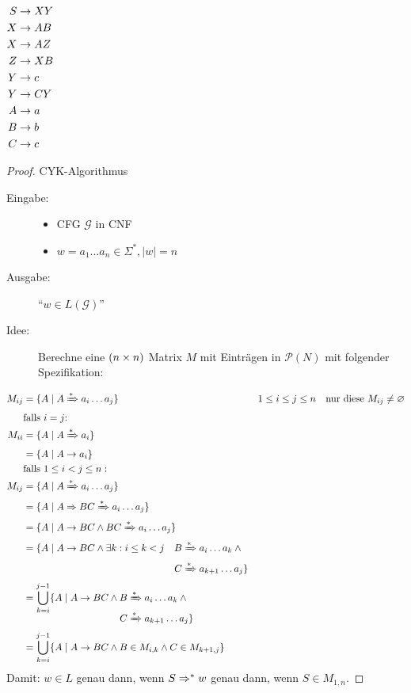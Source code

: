 	$\begin{aligned}[t]
		S &\-> XY\\
		X &\-> AB\\
		X &\-> AZ\\
		Z &\-> XB\\
		Y &\-> c\\
		Y &\-> CY\\
		A &\-> a\\
		B &\-> b\\
		C &\-> c
	\end{aligned}$\quad
\begin{proof}
		\ac{CYK}-Algorithmus
		\begin{description}
	    \item[Eingabe:]
		\begin{itemize}
			\item \ac{CFG} $\mathcal{G}$ in \ac{CNF}
			\item $w = a_1\dots a_n\in\Sigma^*, |w|=n$
		\end{itemize}
		\item[Ausgabe:] "`$w\in L(\mathcal{G})$"'
		\item[Idee:] Berechne eine $(n\times n)$ Matrix $M$ mit Einträgen in $\mathcal{P}(N)$ mit folgender Spezifikation:
		\end{description}
	\begin{align*}
		M_{ij} &= \{ A \mid A\xRightarrow{*} a_i\dots a_j \} && 1\leq i\leq j\leq n \quad\text{nur diese }M_{ij}\neq \varnothing\\
		& \text{falls $i=j$:}\\
		M_{ii} &= \{ A \mid A\xRightarrow{*} a_i\}\\
		&= \{A \mid A\-> a_i \} \\
		&\text{falls }1\leq i<j\leq n:\\
		M_{ij} &= \{ A \mid A\xRightarrow{*} a_i\dots a_j \}\\
		&= \{ A \mid A\=> BC \xRightarrow{*} a_i\dots a_j \}\\
		&= \{ A \mid A\-> BC \land BC \xRightarrow{*} a_i\dots a_j \}\\
		&= \{ A \mid A\-> BC \land \exists k: i\leq k<j\quad 
			\begin{aligned}[t]
				B &\xRightarrow{*} a_i\dots a_k \land{}\\
				C &\xRightarrow{*} a_{k+1}\dots a_j \}
			\end{aligned}\\
		&= \bigcup_{k=i}^{j-1} \{ A \mid A \-> BC \land 
			\begin{aligned}[t]
				B &\xRightarrow{*} a_i\dots a_k \land{}\\
				C &\xRightarrow{*} a_{k+1}\dots a_j \}
			\end{aligned}\\
		&= \bigcup_{k=i}^{j-1} \{ A \mid A \-> BC \land B \in M_{i,k} \land C \in M_{k+1,j} \}
	\end{align*}
	Damit: $w\in L$ genau dann, wenn $S \=>^* w$ genau dann, wenn $S \in M_{1,n}$.
	

\end{proof}
